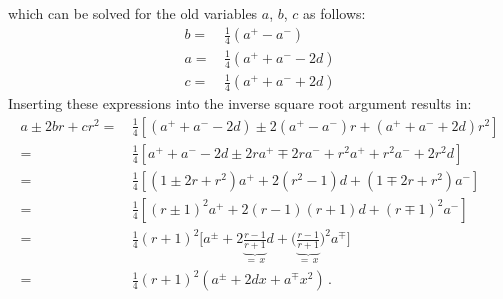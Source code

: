 which can be solved for the old variables $a$, $b$, $c$ as follows:
\begin{align}
 b =&\, \frac{1}{4} \left( a^{+} - a^{-} \right) \nonumber \\
 a =&\, \frac{1}{4} \left( a^{+} + a^{-} - 2d \right) \\
 c =&\, \frac{1}{4} \left( a^{+} + a^{-} + 2d \right) \nonumber
\end{align}
Inserting these expressions into the inverse square root argument results in:
\begin{align}
 a \pm 2 b r + c r^2
 =&\, \frac{1}{4} \left[ \left( a^{+} + a^{-} - 2d \right) \pm 2 \left( a^{+} - a^{-} \right) r + \left( a^{+} + a^{-} + 2d \right) r^2 \right] \nonumber \\
 =&\, \frac{1}{4} \left[ a^{+} + a^{-} - 2d \pm 2ra^{+} \mp 2ra^{-} + r^2a^{+} + r^2a^{-} + 2r^2d \right] \nonumber \\
 =&\, \frac{1}{4} \left[ \left( 1 \pm 2r + r^2 \right) a^{+}  + 2 \left( r^2 - 1 \right) d + \left( 1 \mp 2r + r^2 \right) a^{-} \right] \nonumber \\
 =&\, \frac{1}{4} \left[ \left( r \pm 1 \right)^2 a^{+}  + 2 (r-1)(r+1) d + \left( r \mp 1 \right)^2 a^{-} \right] \label{eqn:a_pm_etc} \\
 =&\, \frac{1}{4} (r+1)^2 \Biggl[ a^{\pm}  + 2 \underbrace{\frac{r-1}{r+1}}_{=\,x} d + \Biggl( \underbrace{\frac{r-1}{r+1}}_{=\,x} \Biggr)^2 a^{\mp} \Biggr] \nonumber \\
 =&\, \frac{1}{4} (r+1)^2 \left( a^{\pm}  + 2 d x + a^{\mp} x^2 \right) \, . \nonumber
\end{align}

